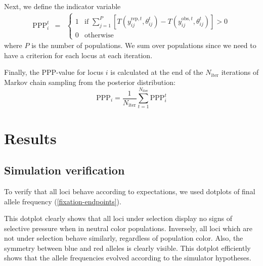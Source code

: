 \documentclass[a4paper,12pt]{article}
\begin{document}
Next, we define the indicator variable
\begin{eqnarray*}
\text{PPP}_i^t &=&
\begin{cases}
  1 & \text{if }\sum_{j=1}^P\left[ T(y_{ij}^{\text{rep},t},\theta_{ij}^t) 
                          - T(y_{ij}^{\text{obs},t},\theta_{ij}^t)\right] > 0\\
  0 & \text{otherwise}
\end{cases}
\end{eqnarray*}
where $P$ is the number of populations. We sum over populations since
we need to have a criterion for each locus at each iteration.

Finally, the PPP-value for locus $i$ is calculated at the end of the
$N_{\text{iter}}$ iterations of Markov chain sampling from the
posterior distribution:
$$
\text{PPP}_i = \frac 1 {N_{\text{iter}}} 
\sum_{t=1}^{N_{\text{iter}}} \text{PPP}_{i}^t
$$

\section{Results}

\subsection{Simulation verification}

To verify that all loci behave according to expectations, we used
dotplots of final allele frequency (\autoref{fixation-endpoints}).


This dotplot clearly shows that all loci under selection display no
signs of selective pressure when in neutral color
populations. Inversely, all loci which are not under selection behave
similarly, regardless of population color. Also, the symmetry between
blue and red alleles is clearly visible. This dotplot efficiently
shows that the allele frequencies evolved according to the simulator
hypotheses.
\end{document}
